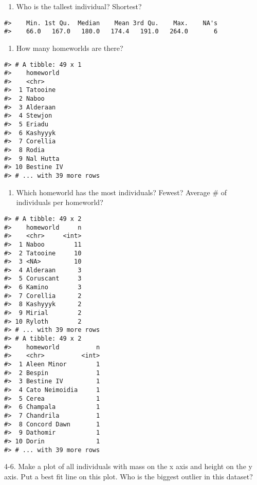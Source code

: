 \documentclass[
]{book}
\providecommand{\tightlist}{%
  \setlength{\itemsep}{0pt}\setlength{\parskip}{0pt}}
\theoremstyle{definition}
\theoremstyle{definition}
\theoremstyle{definition}
\theoremstyle{definition}
\theoremstyle{remark}
\begin{document}
\begin{enumerate}
\def\labelenumi{\arabic{enumi}.}
\tightlist
\item
  Who is the tallest individual? Shortest?
\end{enumerate}

\begin{verbatim}
#>    Min. 1st Qu.  Median    Mean 3rd Qu.    Max.    NA's 
#>    66.0   167.0   180.0   174.4   191.0   264.0       6
\end{verbatim}

\begin{enumerate}
\def\labelenumi{\arabic{enumi}.}
\setcounter{enumi}{1}
\tightlist
\item
  How many homeworlds are there?
\end{enumerate}

\begin{verbatim}
#> # A tibble: 49 x 1
#>    homeworld 
#>    <chr>     
#>  1 Tatooine  
#>  2 Naboo     
#>  3 Alderaan  
#>  4 Stewjon   
#>  5 Eriadu    
#>  6 Kashyyyk  
#>  7 Corellia  
#>  8 Rodia     
#>  9 Nal Hutta 
#> 10 Bestine IV
#> # ... with 39 more rows
\end{verbatim}

\begin{enumerate}
\def\labelenumi{\arabic{enumi}.}
\setcounter{enumi}{2}
\tightlist
\item
  Which homeworld has the most individuals? Fewest? Average \# of individuals per homeworld?
\end{enumerate}

\begin{verbatim}
#> # A tibble: 49 x 2
#>    homeworld     n
#>    <chr>     <int>
#>  1 Naboo        11
#>  2 Tatooine     10
#>  3 <NA>         10
#>  4 Alderaan      3
#>  5 Coruscant     3
#>  6 Kamino        3
#>  7 Corellia      2
#>  8 Kashyyyk      2
#>  9 Mirial        2
#> 10 Ryloth        2
#> # ... with 39 more rows
#> # A tibble: 49 x 2
#>    homeworld          n
#>    <chr>          <int>
#>  1 Aleen Minor        1
#>  2 Bespin             1
#>  3 Bestine IV         1
#>  4 Cato Neimoidia     1
#>  5 Cerea              1
#>  6 Champala           1
#>  7 Chandrila          1
#>  8 Concord Dawn       1
#>  9 Dathomir           1
#> 10 Dorin              1
#> # ... with 39 more rows
\end{verbatim}

4-6. Make a plot of all individuals with mass on the x axis and height on the y axis. Put a best fit line on this plot. Who is the biggest outlier in this dataset?
\end{document}
